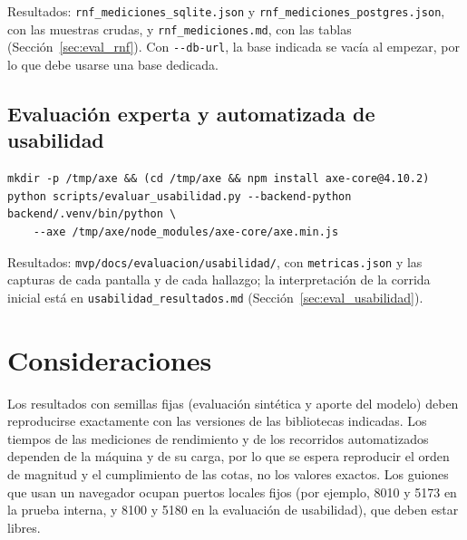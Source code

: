 \noindent Resultados: \texttt{rnf\_mediciones\_sqlite.json} y \texttt{rnf\_mediciones\_postgres.json}, con las muestras crudas, y \texttt{rnf\_mediciones.md}, con las tablas (Sección~\ref{sec:eval_rnf}). Con \verb|--db-url|, la base indicada se vacía al empezar, por lo que debe usarse una base dedicada.

\subsection{Evaluación experta y automatizada de usabilidad}

\begin{footnotesize}
\begin{verbatim}
mkdir -p /tmp/axe && (cd /tmp/axe && npm install axe-core@4.10.2)
python scripts/evaluar_usabilidad.py --backend-python backend/.venv/bin/python \
    --axe /tmp/axe/node_modules/axe-core/axe.min.js
\end{verbatim}
\end{footnotesize}

\noindent Resultados: \texttt{mvp/docs/evaluacion/usabilidad/}, con \texttt{metricas.json} y las capturas de cada pantalla y de cada hallazgo; la interpretación de la corrida inicial está en \texttt{usabilidad\_resultados.md} (Sección~\ref{sec:eval_usabilidad}).

\section{Consideraciones}

Los resultados con semillas fijas (evaluación sintética y aporte del modelo) deben reproducirse exactamente con las versiones de las bibliotecas indicadas. Los tiempos de las mediciones de rendimiento y de los recorridos automatizados dependen de la máquina y de su carga, por lo que se espera reproducir el orden de magnitud y el cumplimiento de las cotas, no los valores exactos. Los guiones que usan un navegador ocupan puertos locales fijos (por ejemplo, 8010 y 5173 en la prueba interna, y 8100 y 5180 en la evaluación de usabilidad), que deben estar libres.
\endgroup
